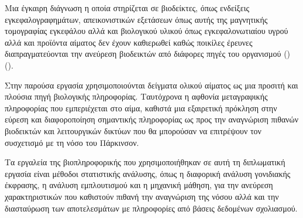 \documentclass[12pt]{report}
\begin{document}
        Μια έγκαιρη διάγνωση η οποία στηρίζεται σε βιοδείκτες, όπως ενδείξεις εγκεφαλογραφημάτων, απεικονιστικών εξετάσεων όπως αυτής της μαγνητικής τομογραφίας εγκεφάλου αλλά και βιολογικού υλικού όπως εγκεφαλονωτιαίου υγρού αλλά και προϊόντα αίματος δεν έχουν καθιερωθεί καθώς ποικίλες έρευνες διαπραγματεύονται την ανεύρεση βιοδεικτών από διάφορες πηγές του οργανισμού (\emph{\cite{Miller2015BiomarkersFuture}}) (\emph{\cite{Maitin2022SurveyReview}}).
    \par
        Στην παρούσα εργασία χρησιμοποιούνται δείγματα ολικού αίματος ως μια προσιτή και πλούσια πηγή βιολογικής πληροφορίας. Ταυτόχρονα η αφθονία μεταγραφικής πληροφορίας που εμπεριέχεται στο αίμα, καθιστά μια εξαιρετική πρόκληση στην εύρεση και διαφοροποίηση σημαντικής πληροφορίας ως προς την αναγνώριση πιθανών βιοδεικτών και λειτουργικών δικτύων που θα μπορούσαν να επιτρέψουν τον συσχετισμό με τη νόσο του Πάρκινσον.
    \par
        Τα εργαλεία της βιοπληροφορικής που χρησιμοποιήθηκαν σε αυτή τη διπλωματική εργασία είναι μέθοδοι στατιστικής ανάλυσης, όπως η διαφορική ανάλυση γονιδιακής έκφρασης, η ανάλυση εμπλουτισμού και η μηχανική μάθηση, για την ανεύρεση χαρακτηριστικών που καθιστούν πιθανή την αναγνώριση της νόσου αλλά και την διασταύρωση των αποτελεσμάτων με πληροφορίες από βάσεις δεδομένων σχολιασμού.
        
    \cleardoublepage
\end{document}
